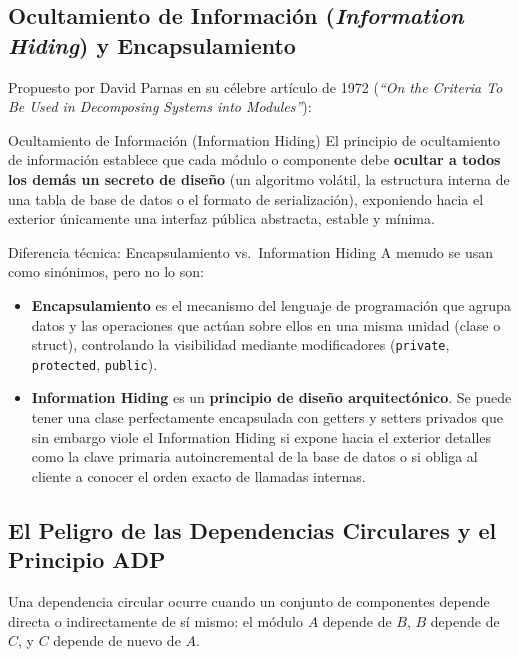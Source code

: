 \subsection{Ocultamiento de Información (\emph{Information Hiding}) y Encapsulamiento}

Propuesto por David Parnas en su célebre artículo de 1972 (\emph{``On the Criteria To Be Used in Decomposing Systems into Modules''}):

\begin{definicion}{Ocultamiento de Información (Information Hiding)}
El principio de ocultamiento de información establece que cada módulo o componente debe \textbf{ocultar a todos los demás un secreto de diseño} (un algoritmo volátil, la estructura interna de una tabla de base de datos o el formato de serialización), exponiendo hacia el exterior únicamente una interfaz pública abstracta, estable y mínima.
\end{definicion}

\begin{importante}{Diferencia técnica: Encapsulamiento vs.\ Information Hiding}
A menudo se usan como sinónimos, pero no lo son:
\begin{itemize}[leftmargin=1.5em]
  \item \textbf{Encapsulamiento} es el mecanismo del lenguaje de programación que agrupa datos y las operaciones que actúan sobre ellos en una misma unidad (clase o struct), controlando la visibilidad mediante modificadores (\texttt{private}, \texttt{protected}, \texttt{public}).
  \item \textbf{Information Hiding} es un \textbf{principio de diseño arquitectónico}. Se puede tener una clase perfectamente encapsulada con getters y setters privados que sin embargo viole el Information Hiding si expone hacia el exterior detalles como la clave primaria autoincremental de la base de datos o si obliga al cliente a conocer el orden exacto de llamadas internas.
\end{itemize}
\end{importante}

\subsection{El Peligro de las Dependencias Circulares y el Principio ADP}

Una dependencia circular ocurre cuando un conjunto de componentes depende directa o indirectamente de sí mismo: el módulo $A$ depende de $B$, $B$ depende de $C$, y $C$ depende de nuevo de $A$.

